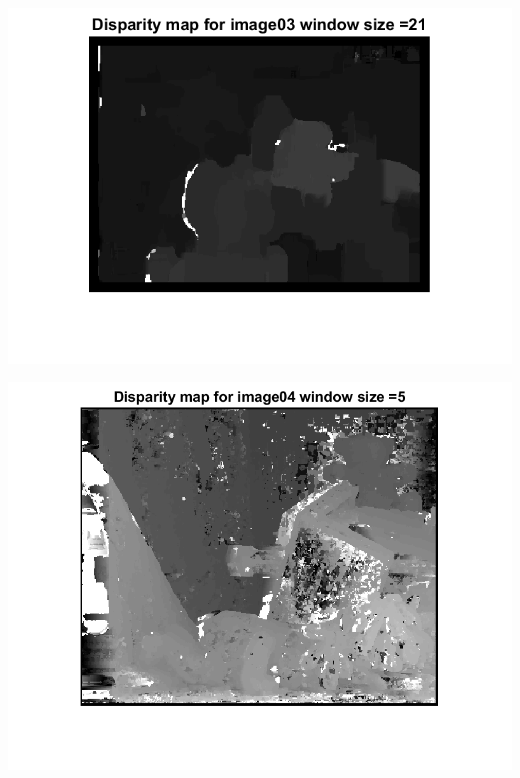 \documentclass[a4paper]{iacas}
\begin{document}
\vskip 0.1in
\begin{minipage}{\linewidth}
	\includegraphics[scale=1]{results/04_16_06/disp_map_03_template_3.png}
	\label{fig_4}
\end{minipage}
\vskip 0.1in
\begin{minipage}{\linewidth}
	\includegraphics[scale=1]{results/04_16_06/disp_map_04_template_1.png}
	\label{fig_4}
\end{minipage}
\vskip 0.1in
\end{document}
